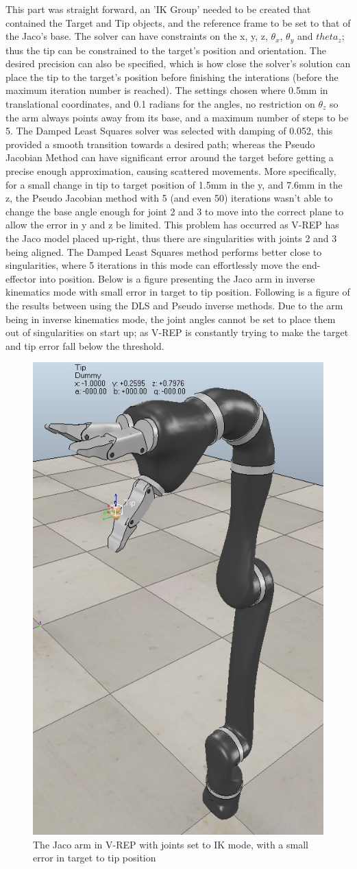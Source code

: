 \documentclass[12pt,openany,a4paper]{book}
\begin{document}
This part was straight forward, an 'IK Group' needed to be created that contained the Target and Tip objects, and the reference frame to be set to that of the Jaco's base. The solver can have constraints on the x, y, z, $\theta_x$, $\theta_y$ and $theta_z$; thus the tip can be constrained to the target's position and orientation. The desired precision can also be specified, which is how close the solver's solution can place the tip to the target's position before finishing the interations (before the maximum iteration number is reached). The settings chosen where 0.5mm in translational coordinates, and 0.1 radians for the angles, no restriction on $\theta_z$ so the arm always points away from its base, and a maximum number of steps to be 5. The Damped Least Squares solver was selected with damping of 0.052, this provided a smooth transition towards a desired path; whereas the Pseudo Jacobian Method can have significant error around the target before getting a precise enough approximation, causing scattered movements. More specifically, for a small change in tip to target position of 1.5mm in the y, and 7.6mm in the z, the Pseudo Jacobian method with 5 (and even 50) iterations wasn't able to change the base angle enough for joint 2 and 3 to move into the correct plane to allow the error in y and z be limited. This problem has occurred as V-REP has the Jaco model placed up-right, thus there are singularities with joints 2 and 3 being aligned. The Damped Least Squares method performs better close to singularities, where 5 iterations in this mode can effortlessly move the end-effector into position. Below is a figure presenting the Jaco arm in inverse kinematics mode with small error in target to tip position. Following is a figure of the results between using the DLS and Pseudo inverse methods. Due to the arm being in inverse kinematics mode, the joint angles cannot be set to place them out of singularities on start up; as V-REP is constantly trying to make the target and tip error fall below the threshold.


\begin{center}
\begin{figure}[htb]
  \includegraphics[width=0.4\linewidth]{Small_change_jaco.jpg}
\caption{The Jaco arm in V-REP with joints set to IK mode, with a small error in target to tip position}
\end{figure}
\end{center}
\end{document}
